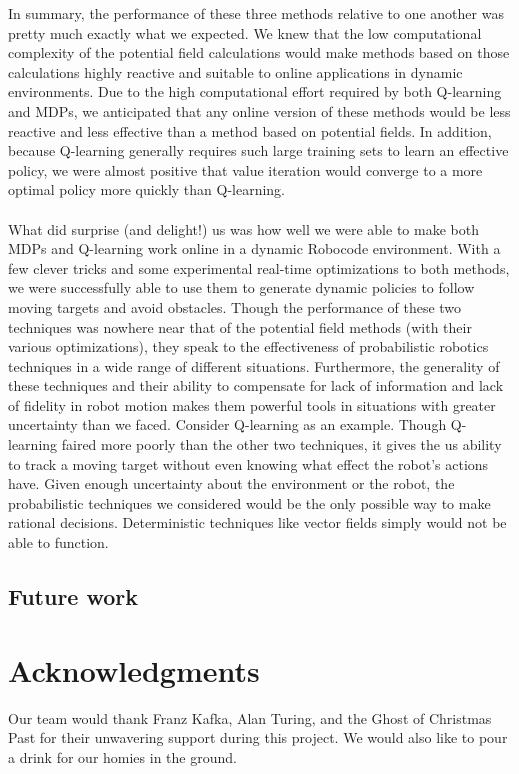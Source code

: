 \documentclass{aiaa-tc}%
\begin{document}
In summary, the performance of these three methods relative to one another was pretty much exactly what we expected. We knew that the low computational complexity of the potential field calculations would make methods based on those calculations highly reactive and suitable to online applications in dynamic environments. Due to the high computational effort required by both Q-learning and MDPs, we anticipated that any online version of these methods would be less reactive and less effective than a method based on potential fields. In addition, because Q-learning generally requires such large training sets to learn an effective policy, we were almost positive that value iteration would converge to a more optimal policy more quickly than Q-learning. \\ \\
What did surprise (and delight!) us was how well we were able to make both MDPs and Q-learning work online in a dynamic Robocode environment. With a few clever tricks and some experimental real-time optimizations to both methods, we were successfully able to use them to generate dynamic policies to follow moving targets and avoid obstacles. Though the performance of these two techniques was nowhere near that of the potential field methods (with their various optimizations), they speak to the effectiveness of probabilistic robotics techniques in a wide range of different situations. Furthermore, the generality of these techniques and their ability to compensate for lack of information and lack of fidelity in robot motion makes them powerful tools in situations with greater uncertainty than we faced. Consider Q-learning as an example. Though Q-learning faired more poorly than the other two techniques, it gives the us ability to track a moving target without even knowing what effect the robot's actions have. Given enough uncertainty about the environment or the robot, the probabilistic techniques we considered would be the only possible way to 
make rational decisions. Deterministic techniques like vector fields simply would not be able to function.
\subsection{Future work}

\section{Acknowledgments}
Our team would thank Franz Kafka, Alan Turing, and the Ghost of
Christmas Past for their unwavering support during this project. We
would also like to pour a drink for our homies in the ground.


% 

% 
\end{document}
